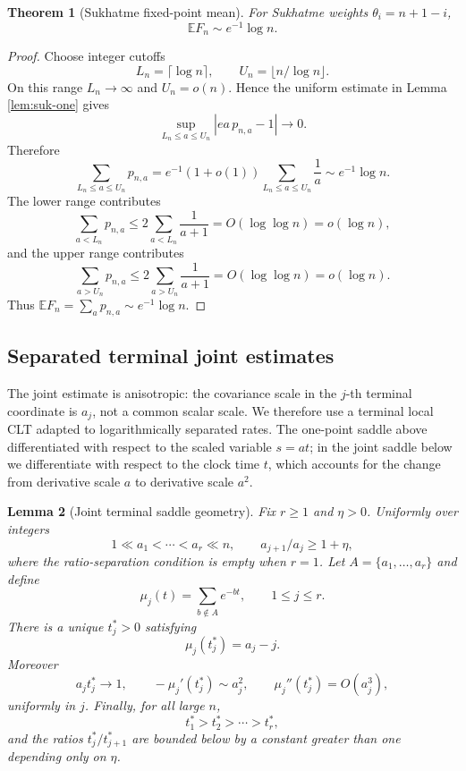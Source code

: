 \documentclass[11pt]{article}
\newtheorem{theorem}{Theorem}[section]
\newtheorem{lemma}[theorem]{Lemma}
\theoremstyle{remark}
\newcommand{\Ee}{\mathbb E}
\begin{document}
\begin{theorem}[Sukhatme fixed-point mean]\label{thm:suk-mean}
For Sukhatme weights \(\theta_i=n+1-i\),
\[
        \Ee F_n\sim e^{-1}\log n.
\]
\end{theorem}

\begin{proof}
Choose integer cutoffs
\[
        L_n=\lceil\log n\rceil,
        \qquad
        U_n=\lfloor n/\log n\rfloor .
\]
On this range \(L_n\to\infty\) and \(U_n=o(n)\).  Hence the uniform estimate in Lemma \ref{lem:suk-one} gives
\[
        \sup_{L_n\le a\le U_n}
        \left|ea\,p_{n,a}-1\right|\to0.
\]
Therefore
\[
        \sum_{L_n\le a\le U_n}p_{n,a}
        =e^{-1}(1+o(1))
        \sum_{L_n\le a\le U_n}\frac1a
        \sim e^{-1}\log n.
\]
The lower range contributes
\[
        \sum_{a<L_n}p_{n,a}
        \le 2\sum_{a<L_n}\frac1{a+1}
        =O(\log\log n)=o(\log n),
\]
and the upper range contributes
\[
        \sum_{a>U_n}p_{n,a}
        \le 2\sum_{a>U_n}\frac1{a+1}
        =O(\log\log n)=o(\log n).
\]
Thus \(\Ee F_n=\sum_a p_{n,a}\sim e^{-1}\log n\).
\end{proof}

\subsection{Separated terminal joint estimates}

The joint estimate is anisotropic: the covariance scale in the \(j\)-th terminal coordinate is \(a_j\), not a common scalar scale.  We therefore use a terminal local CLT adapted to logarithmically separated rates.  The one-point saddle above differentiated with respect to the scaled variable \(s=at\); in the joint saddle below we differentiate with respect to the clock time \(t\), which accounts for the change from derivative scale \(a\) to derivative scale \(a^2\).

\begin{lemma}[Joint terminal saddle geometry]\label{lem:suk-joint-saddle}
Fix \(r\ge1\) and \(\eta>0\).  Uniformly over integers
\[
        1\ll a_1<\cdots<a_r\ll n,
        \qquad a_{j+1}/a_j\ge1+\eta,
\]
where the ratio-separation condition is empty when \(r=1\).  Let \(A=\{a_1,\ldots,a_r\}\) and define
\[
        \mu_j(t)=\sum_{b\notin A}e^{-bt},
        \qquad 1\le j\le r.
\]
There is a unique \(t_j^*>0\) satisfying
\[
        \mu_j(t_j^*)=a_j-j.
\]
Moreover
\[
        a_jt_j^*\to1,
        \qquad
        -\mu_j'(t_j^*)\sim a_j^2,
        \qquad
        \mu_j''(t_j^*)=O(a_j^3),
\]
uniformly in \(j\).  Finally, for all large \(n\),
\[
        t_1^*>t_2^*>\cdots>t_r^*,
\]
and the ratios \(t_j^*/t_{j+1}^*\) are bounded below by a constant greater than one depending only on \(\eta\).
\end{lemma}
\end{document}
